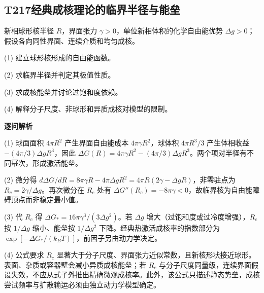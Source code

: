 \par\medskip

\subsection*{T217\quad 经典成核理论的临界半径与能垒}

新相球形核半径 $R$，界面张力 $\gamma>0$，单位新相体积的化学自由能优势 $\Delta g>0$；假设各向同性界面、连续介质和均匀成核。

(1) 建立球形核形成的自由能函数。

(2) 求临界半径并判定其极值性质。

(3) 求成核能垒并讨论过饱和度依赖。

(4) 解释分子尺度、非球形和异质成核对模型的限制。

\par\textbf{逐问解析}

(1) 球面面积 $4\pi R^2$ 产生界面自由能成本 $4\pi\gamma R^2$，球体积 $4\pi R^3/3$ 产生体相收益 $-(4\pi/3)\Delta gR^3$，因此 $\Delta G(R)=4\pi\gamma R^2-(4\pi/3)\Delta gR^3$。两个项对半径有不同幂次，形成激活能垒。

(2) 微分得 $d\Delta G/dR=8\pi\gamma R-4\pi\Delta gR^2=4\pi R(2\gamma-\Delta gR)$，非零驻点为 $R_c=2\gamma/\Delta g$。再次微分在 $R_c$ 处有 $\Delta G''(R_c)=-8\pi\gamma<0$，故临界核为自由能障碍顶点而非稳定最小值。

(3) 代 $R_c$ 得 $\Delta G_*=16\pi\gamma^3/(3\Delta g^2)$。若 $\Delta g$ 增大（过饱和度或过冷度增强），$R_c$ 按 $1/\Delta g$ 缩小、能垒按 $1/\Delta g^2$ 下降。经典热激活成核率的指数部分为 $\exp[-\Delta G_*/(k_BT)]$，前因子另由动力学决定。

(4) 公式要求 $R_c$ 显著大于分子尺度、界面张力近似常数，且新核形状接近球形。表面、杂质或容器壁会减小异质成核能垒；若 $R_c$ 与分子尺度同量级，连续界面假设失效，不应从式子外推出精确微观成核率。此外，该公式只描述静态势垒，成核尝试频率与扩散输运必须由独立动力学模型确定。

\par\medskip
